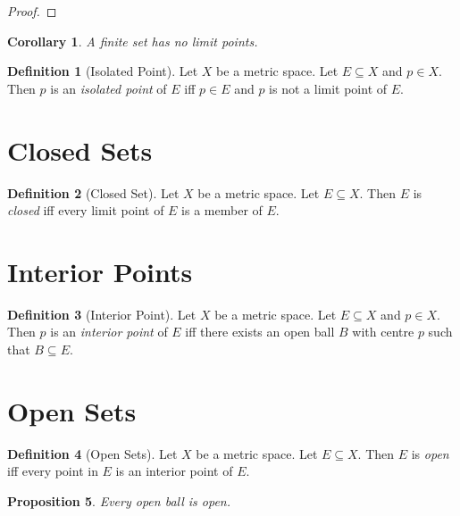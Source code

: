 \documentclass{book}
\let\qed\relax
\newtheorem{prop}{Proposition}[chapter]
\newtheorem{cor}{Corollary}[prop]
\theoremstyle{definition}
\newtheorem{df}[prop]{Definition}
\begin{document}
\begin{proof}
\pf
{}
\qed
\end{proof}

\begin{cor}
A finite set has no limit points.
\end{cor}

\begin{df}[Isolated Point]
Let $X$ be a metric space. Let $E \subseteq X$ and $p \in X$. Then $p$ is an \emph{isolated point} of $E$ iff $p \in E$ and $p$ is not a limit point of $E$.
\end{df}

\section{Closed Sets}

\begin{df}[Closed Set]
Let $X$ be a metric space. Let $E \subseteq X$. Then $E$ is \emph{closed} iff every limit point of $E$ is a member of $E$.
\end{df}

\section{Interior Points}

\begin{df}[Interior Point]
Let $X$ be a metric space. Let $E \subseteq X$ and $p \in X$. Then $p$ is an \emph{interior point} of $E$ iff there exists an open ball $B$ with centre $p$ such that $B \subseteq E$.
\end{df}

\section{Open Sets}

\begin{df}[Open Sets]
Let $X$ be a metric space. Let $E \subseteq X$. Then $E$ is \emph{open} iff every point in $E$ is an interior point of $E$.
\end{df}

\begin{prop}
Every open ball is open.
\end{prop}
\end{document}
